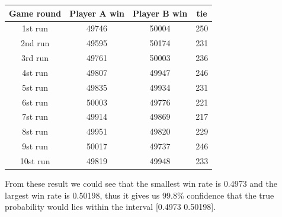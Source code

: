 \documentclass[12pt]{article}
\begin{document}
\begin{table}[H]
  \begin{center}
    \begin{tabular}{|c|c|c|c|}
    \hline
    \textbf{Game round}
    & \textbf{Player A win} & \textbf{Player B win} & \textbf{tie} \\
    \hline
    1st run & 49746 & 50004 & 250\\
    \hline
    2nd run & 49595 & 50174 & 231\\
    \hline
    3rd run & 49761 & 50003 & 236\\
    \hline
    4st run & 49807 & 49947 & 246\\
    \hline
    5st run & 49835 & 49934 & 231\\
    \hline
    6st run & 50003 & 49776 & 221\\
    \hline
    7st run & 49914 & 49869 & 217\\
    \hline
    8st run & 49951 & 49820 & 229\\
    \hline
    9st run & 50017 & 49737 & 246\\
    \hline
    10st run & 49819 & 49948 & 233\\
    \hline
    \end{tabular}
  \end{center}
\end{table}
From these result we could see that the smallest win rate is 0.4973 and the largest win rate is 0.50198, thus it gives us 99.8\% confidence that the true probability would lies within the interval [0.4973 0.50198].
\end{document}
